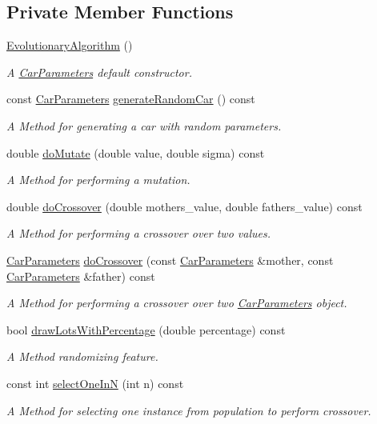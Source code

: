 \subsection*{Private Member Functions}
\begin{DoxyCompactItemize}
\item 
\hyperlink{classEvolutionaryAlgorithm_a7a37fb1cdb3f585529af74dec4d0bf8d}{Evolutionary\+Algorithm} ()
\begin{DoxyCompactList}\small\item\em A \hyperlink{classCarParameters}{Car\+Parameters} default constructor. \end{DoxyCompactList}\item 
const \hyperlink{classCarParameters}{Car\+Parameters} \hyperlink{classEvolutionaryAlgorithm_a4f36e597080d9822c36837c8a582d4d0}{generate\+Random\+Car} () const
\begin{DoxyCompactList}\small\item\em A Method for generating a car with random parameters. \end{DoxyCompactList}\item 
double \hyperlink{classEvolutionaryAlgorithm_a02a05f75707440141d9ec3129cadc681}{do\+Mutate} (double value, double sigma) const
\begin{DoxyCompactList}\small\item\em A Method for performing a mutation. \end{DoxyCompactList}\item 
double \hyperlink{classEvolutionaryAlgorithm_a1f0c3d66b8abfdcdf6eedf065580cef6}{do\+Crossover} (double mothers\+\_\+value, double fathers\+\_\+value) const
\begin{DoxyCompactList}\small\item\em A Method for performing a crossover over two values. \end{DoxyCompactList}\item 
\hyperlink{classCarParameters}{Car\+Parameters} \hyperlink{classEvolutionaryAlgorithm_a387fba63cd849a74652c6de1beb82318}{do\+Crossover} (const \hyperlink{classCarParameters}{Car\+Parameters} \&mother, const \hyperlink{classCarParameters}{Car\+Parameters} \&father) const
\begin{DoxyCompactList}\small\item\em A Method for performing a crossover over two \hyperlink{classCarParameters}{Car\+Parameters} object. \end{DoxyCompactList}\item 
bool \hyperlink{classEvolutionaryAlgorithm_a20aec1049a8837cddef2305259450fe3}{draw\+Lots\+With\+Percentage} (double percentage) const
\begin{DoxyCompactList}\small\item\em A Method randomizing feature. \end{DoxyCompactList}\item 
const int \hyperlink{classEvolutionaryAlgorithm_a8efaa380f6d1b9a2f8a6ad44e2d362e2}{select\+One\+InN} (int n) const
\begin{DoxyCompactList}\small\item\em A Method for selecting one instance from population to perform crossover. \end{DoxyCompactList}\end{DoxyCompactItemize}
